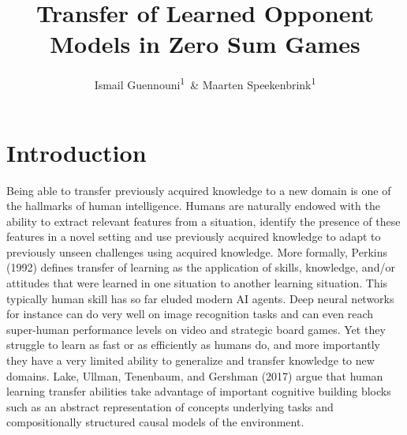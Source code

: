 \documentclass[man,floatsintext]{apa6}
\title{Transfer of Learned Opponent Models in Zero Sum Games}
\author{Ismail Guennouni\textsuperscript{1}~\& Maarten Speekenbrink\textsuperscript{1}}
\date{}
\begin{document}
\maketitle

\hypertarget{introduction}{%
\section{Introduction}\label{introduction}}

Being able to transfer previously acquired knowledge to a new domain is one of the hallmarks of human intelligence. Humans are naturally endowed with the ability to extract relevant features from a situation, identify the presence of these features in a novel setting and use previously acquired knowledge to adapt to previously unseen challenges using acquired knowledge. More formally, Perkins (1992) defines transfer of learning as the application of skills, knowledge, and/or attitudes that were learned in one situation to another learning situation. This typically human skill has so far eluded modern AI agents. Deep neural networks for instance can do very well on image recognition tasks and can even reach super-human performance levels on video and strategic board games. Yet they struggle to learn as fast or as efficiently as humans do, and more importantly they have a very limited ability to generalize and transfer knowledge to new domains. Lake, Ullman, Tenenbaum, and Gershman (2017) argue that human learning transfer abilities take advantage of important cognitive building blocks such as an abstract representation of concepts underlying tasks and compositionally structured causal models of the environment.
\end{document}
